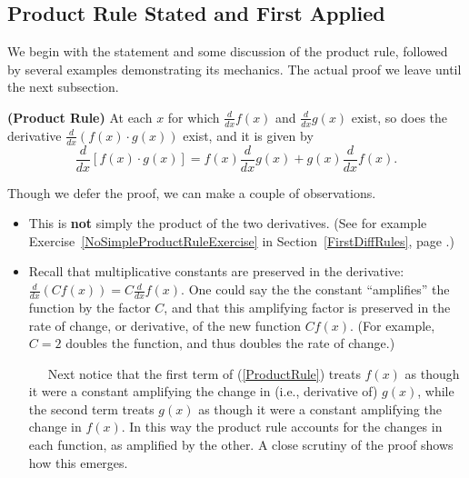 \subsection{Product Rule Stated and First Applied}
We begin with the statement and some discussion of the product rule,
followed by several examples demonstrating its mechanics.  
The actual proof we leave until the next subsection.
\begin{theorem}{\rm\bf(Product Rule)} 
At each $x$ for which $\frac{d}{dx}f(x)$
and $\frac{d}{dx}g(x)$ exist, so
does the derivative
$\frac{d}{dx}\left(f(x)\cdot g(x)\right)$ exist,
and it is given by
\begin{equation}
\frac{d}{dx}\left[f(x)\cdot g(x)\right]
=f(x)\frac{d}{dx}g(x)+g(x)\frac{d}{dx}f(x).
\label{ProductRule}\end{equation}\label{ProductRuleTheorem}
\end{theorem}
Though we defer the proof, we can make a couple of observations.
\begin{itemize}
\item This is {\bf not} simply the product of the two
      derivatives. (See for example 
      Exercise~\ref{NoSimpleProductRuleExercise} in
      Section~\ref{FirstDiffRules}, page 
      \pageref{NoSimpleProductRuleExercise}.)
\item Recall that multiplicative constants are preserved
      in the derivative: $\frac{d}{dx}(Cf(x))=C\frac{d}{dx}f(x)$.
      One could say the the constant ``amplifies'' the function by the 
      factor $C$, and that this amplifying factor is preserved in 
      the rate of change, or derivative, of the new function $Cf(x)$.
      (For example, $C=2$ doubles the function, and thus doubles
      the rate of change.)
     
      \ \ \ Next notice that the first term of (\ref{ProductRule})
      treats $f(x)$ as though it were a constant amplifying the
      change in (i.e., derivative of) $g(x)$, while the
      second term treats $g(x)$ as though it were a constant
      amplifying the change in $f(x)$.  In this way the
      product rule accounts for the changes in each function,
      as amplified by the other.  A close scrutiny of the
      proof shows how this emerges.
\end{itemize}\label{NotesOnProductRule}

